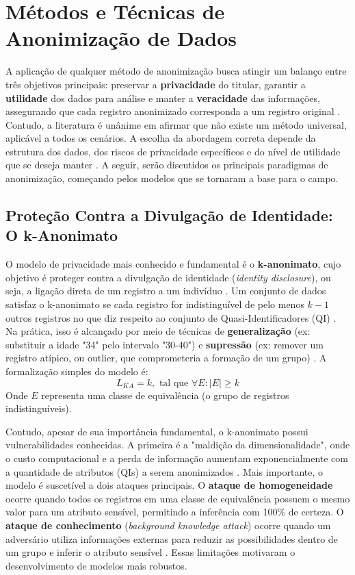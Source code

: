 
\section{Métodos e Técnicas de Anonimização de Dados}
\label{sec:fund-metodos-anon}

A aplicação de qualquer método de anonimização busca atingir um balanço entre três objetivos principais: preservar a \textbf{privacidade} do titular, garantir a \textbf{utilidade} dos dados para análise e manter a \textbf{veracidade} das informações, assegurando que cada registro anonimizado corresponda a um registro original \cite{Olatunji2024}. Contudo, a literatura é unânime em afirmar que não existe um método universal, aplicável a todos os cenários. A escolha da abordagem correta depende da estrutura dos dados, dos riscos de privacidade específicos e do nível de utilidade que se deseja manter \cite{Vovk2023}. A seguir, serão discutidos os principais paradigmas de anonimização, começando pelos modelos que se tornaram a base para o campo.

\subsection{Proteção Contra a Divulgação de Identidade: O k-Anonimato}
\label{subsec:fund-k-anonimato}

O modelo de privacidade mais conhecido e fundamental é o \textbf{k-anonimato}, cujo objetivo é proteger contra a divulgação de identidade (\textit{identity disclosure}), ou seja, a ligação direta de um registro a um indivíduo \cite{Sepas2022, Vovk2023}. Um conjunto de dados satisfaz o k-anonimato se cada registro for indistinguível de pelo menos $k-1$ outros registros no que diz respeito ao conjunto de Quasi-Identificadores (QI) \cite{Zuo2021Data, Olatunji2024}. Na prática, isso é alcançado por meio de técnicas de \textbf{generalização} (ex: substituir a idade "34" pelo intervalo "30-40") e \textbf{supressão} (ex: remover um registro atípico, ou outlier, que comprometeria a formação de um grupo) \cite{Sepas2022}. A formalização simples do modelo é:
$$L_{KA} = k, \text{ tal que } \forall E : |E| \geq k$$
Onde $E$ representa uma classe de equivalência (o grupo de registros indistinguíveis).

Contudo, apesar de sua importância fundamental, o k-anonimato possui vulnerabilidades conhecidas. A primeira é a "maldição da dimensionalidade", onde o custo computacional e a perda de informação aumentam exponencialmente com a quantidade de atributos (QIs) a serem anonimizados \cite{Zuo2021Data}. Mais importante, o modelo é suscetível a dois ataques principais. O \textbf{ataque de homogeneidade} ocorre quando todos os registros em uma classe de equivalência possuem o mesmo valor para um atributo sensível, permitindo a inferência com 100\% de certeza. O \textbf{ataque de conhecimento} (\textit{background knowledge attack}) ocorre quando um adversário utiliza informações externas para reduzir as possibilidades dentro de um grupo e inferir o atributo sensível \cite{Zuo2021Data, Vovk2023}. Essas limitações motivaram o desenvolvimento de modelos mais robustos.

